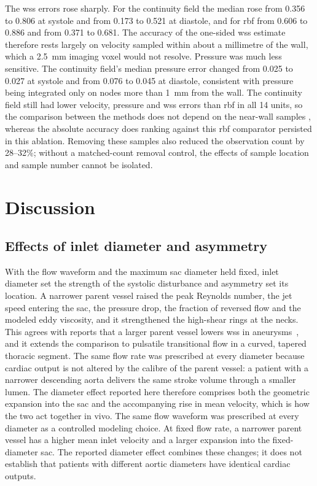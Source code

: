 \documentclass[12pt,a4paper]{article}
\newcommand{\cfdrevision}[1]{#1} %
\newcommand{\WSS}{\ac{wss}\xspace}
\newcommand{\RBF}{\ac{rbf}\xspace}
\theoremstyle{definition}
\numberwithin{equation}{section}
\providecommand{\DIFaddtex}[1]{{\protect\color{blue} \sf #1}} %
\providecommand{\DIFdeltex}[1]{{\protect\color{red} \scriptsize #1}} %
\providecommand{\DIFaddbegin}{} %
\providecommand{\DIFaddend}{} %
\providecommand{\DIFdelbegin}{} %
\providecommand{\DIFdelend}{} %
\providecommand{\DIFadd}[1]{\texorpdfstring{\DIFaddtex{#1}}{#1}} %
\providecommand{\DIFdel}[1]{\texorpdfstring{\DIFdeltex{#1}}{}} %
\newcommand{\DIFscaledelfig}{0.5}
\newlength{\DIFdelgraphicswidth} %
\newlength{\DIFdelgraphicsheight} %
\newcommand{\DIFaddincludegraphics}[2][]{{\color{blue}\fbox{\DIFOincludegraphics[#1]{#2}}}} %
\newcommand{\DIFdelincludegraphics}[2][]{%
\sbox{\DIFdelgraphicsbox}{\DIFOincludegraphics[#1]{#2}}%
\settoboxwidth{\DIFdelgraphicswidth}{\DIFdelgraphicsbox} %
\settoboxtotalheight{\DIFdelgraphicsheight}{\DIFdelgraphicsbox} %
\scalebox{\DIFscaledelfig}{%
\parbox[b]{\DIFdelgraphicswidth}{\usebox{\DIFdelgraphicsbox}\\[-\baselineskip] \rule{\DIFdelgraphicswidth}{0em}}\llap{\resizebox{\DIFdelgraphicswidth}{\DIFdelgraphicsheight}{%
\setlength{\unitlength}{\DIFdelgraphicswidth}%
\begin{picture}(1,1)%
\thicklines\linethickness{2pt} %
{\color[rgb]{1,0,0}\put(0,0){\framebox(1,1){}}}%
{\color[rgb]{1,0,0}\put(0,0){\line( 1,1){1}}}%
{\color[rgb]{1,0,0}\put(0,1){\line(1,-1){1}}}%
\end{picture}%
}\hspace*{3pt}}} %
} %
\DeclareRobustCommand{\DIFaddbegin}{\DIFOaddbegin \let\includegraphics\DIFaddincludegraphics} %
\DeclareRobustCommand{\DIFaddend}{\DIFOaddend \let\includegraphics\DIFOincludegraphics} %
\DeclareRobustCommand{\DIFdelbegin}{\DIFOdelbegin \let\includegraphics\DIFdelincludegraphics} %
\DeclareRobustCommand{\DIFdelend}{\DIFOaddend \let\includegraphics\DIFOincludegraphics} %
\begin{document}
The \WSS errors rose sharply. For the continuity field the median rose from 0.356 to 0.806 at systole and from 0.173 to 0.521 at diastole, and for \RBF from 0.606 to 0.886 and from 0.371 to 0.681. The accuracy of the one-sided \WSS estimate therefore rests largely on velocity sampled within about a millimetre of the wall, which a 2.5~mm imaging voxel would not resolve. Pressure was much less sensitive. The continuity field's median pressure error changed from 0.025 to 0.027 at systole and from 0.076 to 0.045 at diastole, consistent with pressure being integrated only on nodes more than 1~mm from the wall. The continuity field still had lower velocity, pressure and \WSS errors than \RBF in all 14 units, so the \DIFdelbegin \DIFdel{comparison between the methods does not depend on the near-wall samples , whereas the absolute }%
\DIFdel{accuracy does}\DIFdelend \DIFaddbegin \DIFadd{ranking against this }\RBF \DIFadd{comparator persisted in this ablation. Removing these samples also reduced the observation count by 28--32\%; without a matched-count removal control, the effects of sample location and sample number cannot be isolated}\DIFaddend .




\section{Discussion}
\label{sec:discussion}
\subsection{Effects of inlet diameter and asymmetry}
With the flow waveform and the maximum sac diameter held fixed, inlet diameter set the strength of the systolic disturbance and asymmetry set its location. A narrower parent vessel raised the peak Reynolds number, the jet speed entering the sac, the pressure drop, the fraction of reversed flow and the modeled eddy viscosity, and it strengthened the high-shear rings at the necks. This agrees with reports that a larger parent vessel lowers \WSS in aneurysms~\cite{fattahi2023influence}, and it extends the comparison to pulsatile transitional flow in a curved, tapered thoracic segment. \DIFdelbegin \DIFdel{The same flow rate was prescribed at every diameter because cardiac output is not altered by the calibre of the parent vessel: a patient with a narrower descending aorta delivers the same stroke volume through a smaller lumen. The diameter effect reported here therefore comprises both the geometric expansion into the sac and the accompanying rise in mean velocity, which is how the two act together in vivo.
}\DIFdelend \DIFaddbegin \DIFadd{\cfdrevision{The same flow waveform was prescribed at every diameter as a controlled modeling choice. At fixed flow rate, a narrower parent vessel has a higher mean inlet velocity and a larger expansion into the fixed-diameter sac. The reported diameter effect combines these changes; it does not establish that patients with different aortic diameters have identical cardiac outputs.}
}\DIFaddend 
\end{document}
